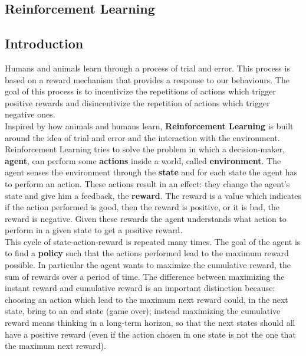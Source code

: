 \documentclass[14pt]{extarticle}
\def\sp{\vspace{5pt}}
\def\pp{\vspace{10pt}\newline}
\begin{document}
\newpage
\begin{center}
	\section{Reinforcement Learning}
\end{center}

\subsection{Introduction}
\sp
\begin{flushleft}
Humans and animals learn through a process of trial and error. This process is based on a reward mechanism that provides a response to our behaviours. The goal of this process is to incentivize the repetitions of actions which trigger positive rewards and disincentivize the repetition of actions which trigger negative ones.
\\
Inspired by how animals and humans learn, \textbf{Reinforcement Learning} is built around the idea of trial and error and the interaction with the environment.
\pp
Reinforcement Learning tries to solve the problem in which a decision-maker, \textbf{agent}, can perform some \textbf{actions} inside a world, called \textbf{environment}. The agent senses the environment through the \textbf{state} and for each state the agent has to perform an action. These actions result in an effect: they change the agent's state and give him a feedback, the \textbf{reward}. The reward is a value which indicates if the action performed is good, then the reward is positive, or it is bad, the reward is negative. Given these rewards the agent understands what action to perform in a given state to get a positive reward. 
\\
This cycle of state-action-reward is repeated many times. The goal of the agent is to find a \textbf{policy} such that the actions performed lead to the maximum reward possible. In particular the agent wants to maximize the cumulative reward, the sum of rewards over a period of time. The difference between maximizing the instant reward and cumulative reward is an important distinction because: choosing an action which lead to the maximum next reward could, in the next state, bring to an end state (game over); instead maximizing the cumulative reward means thinking in a long-term horizon, so that the next states should all have a positive reward (even if the action chosen in one state is not the one that the
maximum next reward).


\end{flushleft}
\end{document}
